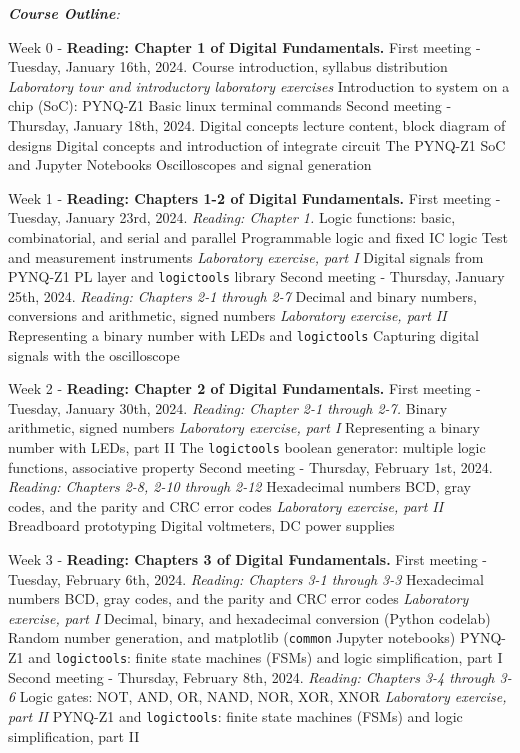 \documentclass[10pt]{article}
\begin{document}
\textit{\textbf{Course Outline}:}
\begin{outline}[enumerate]

\1 Week 0 - \textbf{Reading: Chapter 1 of Digital Fundamentals.}
\2 First meeting - Tuesday, January 16th, 2024.
\3 Course introduction, syllabus distribution
\3 \textit{Laboratory tour and introductory laboratory exercises}
\4 Introduction to system on a chip (SoC): PYNQ-Z1
\4 Basic linux terminal commands
\2 Second meeting - Thursday, January 18th, 2024.
\3 Digital concepts lecture content, block diagram of designs
\3 Digital concepts and introduction of integrate circuit
\4 The PYNQ-Z1 SoC and Jupyter Notebooks
\4 Oscilloscopes and signal generation

\1 Week 1 - \textbf{Reading: Chapters 1-2 of Digital Fundamentals.}
\2 First meeting - Tuesday, January 23rd, 2024. \textit{Reading: Chapter 1.}
\3 Logic functions: basic, combinatorial, and serial and parallel
\3 Programmable logic and fixed IC logic
\3 Test and measurement instruments
\3 \textit{Laboratory exercise, part I}
\4 Digital signals from PYNQ-Z1
\4 PL layer and \verb+logictools+ library
\2 Second meeting - Thursday, January 25th, 2024. \textit{Reading: Chapters 2-1 through 2-7}
\3 Decimal and binary numbers, conversions and arithmetic, signed numbers
\3 \textit{Laboratory exercise, part II}
\4 Representing a binary number with LEDs and \verb+logictools+
\4 Capturing digital signals with the oscilloscope

\1 Week 2 - \textbf{Reading: Chapter 2 of Digital Fundamentals.}
\2 First meeting - Tuesday, January 30th, 2024. \textit{Reading: Chapter 2-1 through 2-7.}
\3 Binary arithmetic, signed numbers
\3 \textit{Laboratory exercise, part I}
\4 Representing a binary number with LEDs, part II
\4 The \verb+logictools+ boolean generator: multiple logic functions, associative property
\2 Second meeting - Thursday, February 1st, 2024. \textit{Reading: Chapters 2-8, 2-10 through 2-12}
\3 Hexadecimal numbers
\3 BCD, gray codes, and the parity and CRC error codes
\3 \textit{Laboratory exercise, part II}
\4 Breadboard prototyping
\4 Digital voltmeters, DC power supplies

\clearpage

\1 Week 3 - \textbf{Reading: Chapters 3 of Digital Fundamentals.}
\2 First meeting - Tuesday, February 6th, 2024.  \textit{Reading: Chapters 3-1 through 3-3}
\3 Hexadecimal numbers
\3 BCD, gray codes, and the parity and CRC error codes
\3 \textit{Laboratory exercise, part I}
\4 Decimal, binary, and hexadecimal conversion (Python codelab)
\4 Random number generation, and matplotlib (\verb+common+ Jupyter notebooks)
\4 PYNQ-Z1 and \verb+logictools+: finite state machines (FSMs) and logic simplification, part I
\2 Second meeting - Thursday, February 8th, 2024. \textit{Reading: Chapters 3-4 through 3-6}
\3 Logic gates: NOT, AND, OR, NAND, NOR, XOR, XNOR
\3 \textit{Laboratory exercise, part II}
\4 PYNQ-Z1 and \verb+logictools+: finite state machines (FSMs) and logic simplification, part II


\end{outline}
\end{document}
